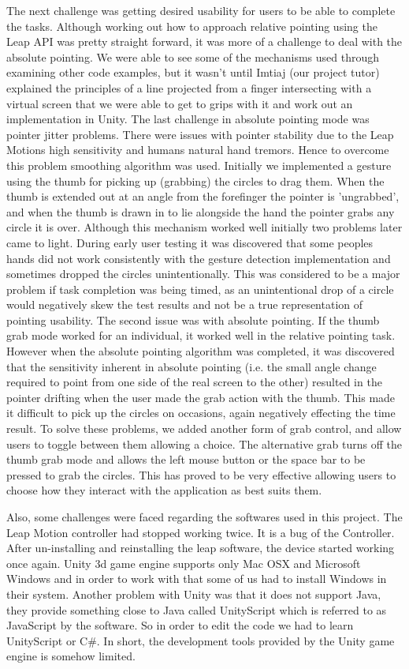 \documentclass[titlepage]{article}
\begin{document}
The next challenge was getting desired usability for users to be able to complete the tasks. Although working out how to approach relative pointing using the Leap API was pretty straight forward, it was more of a challenge to deal with the absolute pointing. We were able to see some of the mechanisms used through examining other code examples, but it wasn't until Imtiaj (our project tutor) explained the principles of a line projected from a finger intersecting with a virtual screen that we were able to get to grips with it and work out an implementation in Unity. The last challenge in absolute pointing mode was pointer jitter problems. There were issues with pointer stability due to the Leap Motions high sensitivity and humans natural hand tremors. Hence to overcome this problem smoothing algorithm was used. Initially we implemented a gesture using the thumb for picking up (grabbing) the circles to drag them. When the thumb is extended out at an angle from the forefinger the pointer is 'ungrabbed', and when the thumb is drawn in to lie alongside the hand the pointer grabs any circle it is over. Although this mechanism worked well initially two problems later came to light. During early user testing it was discovered that some peoples hands did not work consistently with the gesture detection implementation and sometimes dropped the circles unintentionally. This was considered to be a major problem if task completion was being timed, as an unintentional drop of a circle would negatively skew the test results and not be a true representation of  pointing usability. The second issue was with absolute pointing. If the thumb grab mode worked for an individual, it worked well in the relative pointing task. However when the absolute pointing algorithm was completed, it was discovered that the sensitivity inherent in absolute pointing (i.e. the small angle change required to point from one side of the real screen to the other) resulted in the pointer drifting when the user made the grab action with the thumb. This made it difficult to pick up the circles on occasions, again negatively effecting the time result. To solve these problems, we added another form of grab control, and allow users to toggle between them allowing a choice. The alternative grab turns off the thumb grab mode and allows the left mouse button or the space bar to be pressed to grab the circles. This has proved to be very effective allowing users to choose how they interact with the application as best suits them.
  
Also, some challenges were faced regarding the softwares used in this project. The Leap Motion controller had stopped working twice. It is a bug of the Controller. After un-installing and reinstalling the leap software, the device started working once again. Unity 3d game engine supports only Mac OSX and Microsoft Windows and in order to work with that some of us had to install Windows in their system. Another problem with Unity was that it does not support Java, they provide something close to Java called UnityScript which is referred to as JavaScript by the software. So in order to edit the code we had to learn UnityScript or C#. In short, the development tools provided by the Unity game engine is somehow limited.
\end{document}
